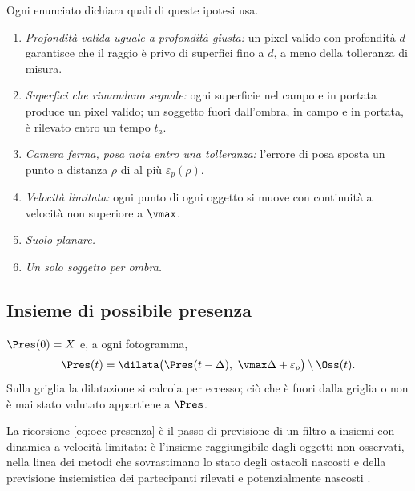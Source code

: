 \begin{ipotesi}[Modello]\label{ip:occ-modello}
Ogni enunciato dichiara quali di queste ipotesi usa.
\begin{enumerate}[label=(\roman*),itemsep=0pt]
\item \emph{Profondità valida uguale a profondità giusta:} un pixel valido con profondità $d$ garantisce che il raggio è privo di superfici fino a $d$, a meno della tolleranza di misura.
\item \emph{Superfici che rimandano segnale:} ogni superficie nel campo e in portata produce un pixel valido; un soggetto fuori dall'ombra, in campo e in portata, è rilevato entro un tempo $t_a$.
\item \emph{Camera ferma, posa nota entro una tolleranza:} l'errore di posa sposta un punto a distanza $\rho$ di al più $\varepsilon_p(\rho)$.
\item \emph{Velocità limitata:} ogni punto di ogni oggetto si muove con continuità a velocità non superiore a $\vmax$.
\item \emph{Suolo planare.}
\item \emph{Un solo soggetto per ombra.}
\end{enumerate}
\end{ipotesi}

\subsection{Insieme di possibile presenza}\label{sec:occ-presenza}

\begin{definizione}\label{def:occ-presenza}
$\Pres(0)=X$ e, a ogni fotogramma,
\begin{equation}\label{eq:occ-presenza}
\Pres(t)=\dilata\bigl(\Pres(t-\Delta),\ \vmax\Delta+\varepsilon_p\bigr)\setminus\Oss(t).
\end{equation}
Sulla griglia la dilatazione si calcola per eccesso; ciò che è fuori dalla griglia o non è mai stato valutato appartiene a $\Pres$.
\end{definizione}

La ricorsione \eqref{eq:occ-presenza} è il passo di previsione di un filtro a insiemi con dinamica a velocità limitata: è l'insieme raggiungibile dagli oggetti non osservati, nella linea dei metodi che sovrastimano lo stato degli ostacoli nascosti \cite{orzechowski2018} e della previsione insiemistica dei partecipanti rilevati e potenzialmente nascosti \cite{koschi2021}.

